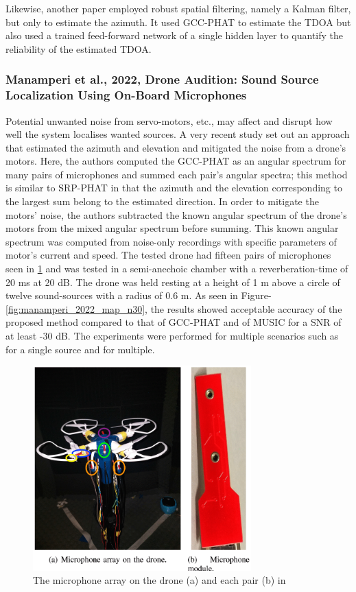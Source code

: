 \documentclass{report}
\begin{document}
Likewise, another paper \cite{kim_robust_2008} employed robust spatial filtering, namely a Kalman filter, but only to estimate the azimuth. It used GCC-PHAT to estimate the TDOA but also used a trained feed-forward network of a single hidden layer to quantify the reliability of the estimated TDOA.

\subsubsection{Manamperi et al., 2022, Drone Audition: Sound Source Localization Using On-Board Microphones}

Potential unwanted noise from servo-motors, etc., may affect and disrupt how well the system localises wanted sources. A very recent study \cite{manamperi_drone_2022} set out an approach that estimated the azimuth and elevation and mitigated the noise from a drone's motors. Here, the authors computed the GCC-PHAT as an angular spectrum for many pairs of microphones and summed each pair's angular spectra; this method is similar to SRP-PHAT in that the azimuth and the elevation corresponding to the largest sum belong to the estimated direction. In order to mitigate the motors' noise, the authors subtracted the known angular spectrum of the drone's motors from the mixed angular spectrum before summing. This known angular spectrum was computed from noise-only recordings with specific parameters of motor's current and speed. The tested drone had fifteen pairs of microphones seen in \ref{fig:manamperi_2022_array} and was tested in a semi-anechoic chamber with a reverberation-time of 20 \si{ms} at 20 \si{dB}. The drone was held resting at a height of 1 \si{m} above a circle of twelve sound-sources with a radius of 0.6 \si{m}. As seen in Figure-\ref{fig:manamperi_2022_map_n30}, the results showed acceptable accuracy of the proposed method compared to that of GCC-PHAT and of MUSIC for a SNR of at least -30 \si{dB}. The experiments were performed for multiple scenarios such as for a single source and for multiple.

\begin{figure}[H]
\includegraphics[width=0.75\textwidth]{./manamperi_2022/array.png}
\centering
\caption{The microphone array on the drone (a) and each pair (b) in \cite{manamperi_drone_2022}}
\label{fig:manamperi_2022_array}
\centering
\end{figure}
\end{document}
